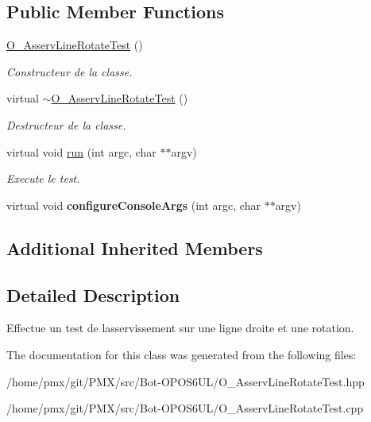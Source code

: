 \subsection*{Public Member Functions}
\begin{DoxyCompactItemize}
\item 
\mbox{\label{classO__AsservLineRotateTest_a7cdd97ea8f0a3af753817ccf9ddf16ea}} 
\hyperlink{classO__AsservLineRotateTest_a7cdd97ea8f0a3af753817ccf9ddf16ea}{O\+\_\+\+Asserv\+Line\+Rotate\+Test} ()
\begin{DoxyCompactList}\small\item\em Constructeur de la classe. \end{DoxyCompactList}\item 
\mbox{\label{classO__AsservLineRotateTest_aa39db0b4cd32a9d074c6ac83673dbde3}} 
virtual \hyperlink{classO__AsservLineRotateTest_aa39db0b4cd32a9d074c6ac83673dbde3}{$\sim$\+O\+\_\+\+Asserv\+Line\+Rotate\+Test} ()
\begin{DoxyCompactList}\small\item\em Destructeur de la classe. \end{DoxyCompactList}\item 
\mbox{\label{classO__AsservLineRotateTest_ac54536863ccc3f6bc0ce3f30e99e1b70}} 
virtual void \hyperlink{classO__AsservLineRotateTest_ac54536863ccc3f6bc0ce3f30e99e1b70}{run} (int argc, char $\ast$$\ast$argv)
\begin{DoxyCompactList}\small\item\em Execute le test. \end{DoxyCompactList}\item 
\mbox{\label{classO__AsservLineRotateTest_a8128bd8b191f39c3fd5e8be3527e97c8}} 
virtual void {\bfseries configure\+Console\+Args} (int argc, char $\ast$$\ast$argv)
\end{DoxyCompactItemize}
\subsection*{Additional Inherited Members}


\subsection{Detailed Description}
Effectue un test de l\textquotesingle{}asservissement sur une ligne droite et une rotation. 

The documentation for this class was generated from the following files\+:\begin{DoxyCompactItemize}
\item 
/home/pmx/git/\+P\+M\+X/src/\+Bot-\/\+O\+P\+O\+S6\+U\+L/O\+\_\+\+Asserv\+Line\+Rotate\+Test.\+hpp\item 
/home/pmx/git/\+P\+M\+X/src/\+Bot-\/\+O\+P\+O\+S6\+U\+L/O\+\_\+\+Asserv\+Line\+Rotate\+Test.\+cpp\end{DoxyCompactItemize}
